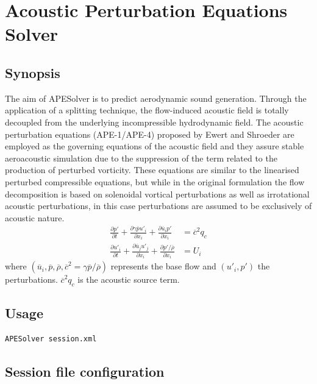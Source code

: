 \chapter{Acoustic Perturbation Equations Solver}

\section{Synopsis}
The aim of APESolver is to predict aerodynamic sound generation. Through
the application of a splitting technique, the flow-induced acoustic field is
totally decoupled from the underlying incompressible hydrodynamic field. The
acoustic perturbation equations (APE-1/APE-4) proposed by Ewert and Shroeder are employed as
the governing equations of the acoustic field and they assure stable
aeroacoustic simulation due to the suppression of the term related to the
production of perturbed vorticity. These equations are similar to the linearised
perturbed compressible equations, but while in the original formulation the flow
decomposition is based on solenoidal vortical perturbations as well as
irrotational acoustic perturbations, in this case perturbations are assumed to
be exclusively of acoustic nature.
\begin{subequations}
    \begin{align*}
        \frac{\partial p'}{\partial t}
        + \frac{\partial \gamma \overline{p} u'_i}{\partial x_i}
        + \frac{\partial \overline{u}_i p'}{\partial x_i}
        &= \overline{c}^2 q_c
        \\
        \frac{\partial u'_i}{\partial t}
        + \frac{\partial \overline{u}_j u'_j}{\partial x_i}
        + \frac{\partial p' / \overline{\rho}}{\partial x_i}
        &= U_i
        \end{align*}
\end{subequations}
where $(\overline{u}_i,\overline{p}, \overline{\rho}, \overline{c}^2 = \gamma \overline{p} / \overline{\rho} )$ represents the base flow and $(u'_i,p')$ the perturbations.
$\overline{c}^2 q_c$ is the acoustic source term.

\section{Usage}
\begin{lstlisting}[style=BashInputStyle]
APESolver session.xml
\end{lstlisting}

\section{Session file configuration}

